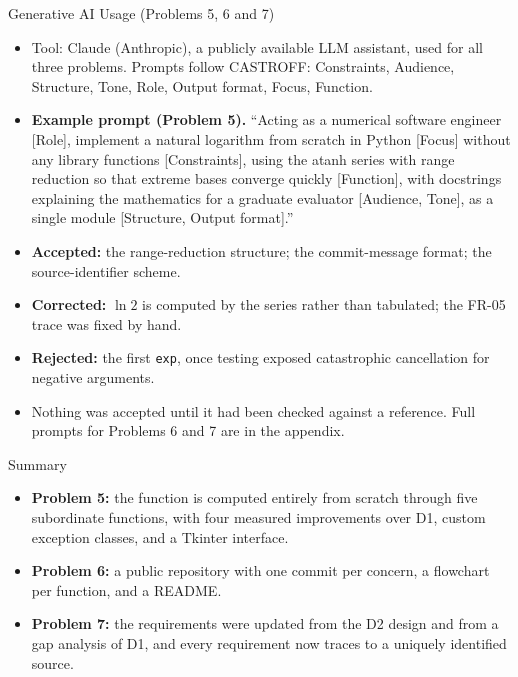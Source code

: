 \documentclass[11pt]{beamer}
\begin{document}
\begin{frame}{Generative AI Usage (Problems 5, 6 and 7)}
  \footnotesize
  \begin{itemize}
    \item Tool: Claude (Anthropic), a publicly available LLM assistant, used
          for all three problems. Prompts follow CASTROFF: Constraints,
          Audience, Structure, Tone, Role, Output format, Focus, Function.
    \item \textbf{Example prompt (Problem 5).} ``Acting as a numerical software
          engineer [Role], implement a natural logarithm from scratch in
          Python [Focus] without any library functions [Constraints], using
          the atanh series with range reduction so that extreme bases converge
          quickly [Function], with docstrings explaining the mathematics for a
          graduate evaluator [Audience, Tone], as a single module
          [Structure, Output format].''
    \item \textbf{Accepted:} the range-reduction structure; the commit-message
          format; the source-identifier scheme.
    \item \textbf{Corrected:} $\ln 2$ is computed by the series rather than
          tabulated; the FR-05 trace was fixed by hand.
    \item \textbf{Rejected:} the first \texttt{exp}, once testing exposed
          catastrophic cancellation for negative arguments.
    \item Nothing was accepted until it had been checked against a reference.
          Full prompts for Problems 6 and 7 are in the appendix.
  \end{itemize}
\end{frame}

\begin{frame}{Summary}
  \begin{itemize}
    \item \textbf{Problem 5:} the function is computed entirely from scratch
          through five subordinate functions, with four measured improvements
          over D1, custom exception classes, and a Tkinter interface.
    \item \textbf{Problem 6:} a public repository with one commit per concern,
          a flowchart per function, and a README.
    \item \textbf{Problem 7:} the requirements were updated from the D2 design
          and from a gap analysis of D1, and every requirement now traces to a
          uniquely identified source.
  \end{itemize}
\end{frame}
\end{document}

